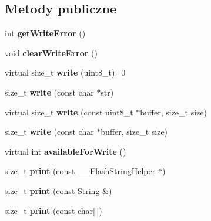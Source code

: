 \subsection*{Metody publiczne}
\begin{DoxyCompactItemize}
\item 
\mbox{\label{class_print_a88a4a829fb5d589efb43955ad0cbddcc}} 
int {\bfseries get\+Write\+Error} ()
\item 
\mbox{\label{class_print_aec9ecf84cc6d9087a650def3cefc459e}} 
void {\bfseries clear\+Write\+Error} ()
\item 
\mbox{\label{class_print_a5be30d49adae2406a270c29ba9a3e0a3}} 
virtual size\+\_\+t {\bfseries write} (uint8\+\_\+t)=0
\item 
\mbox{\label{class_print_a5b40e0e9cab1f2fe5bb0cb22ffe5adda}} 
size\+\_\+t {\bfseries write} (const char $\ast$str)
\item 
\mbox{\label{class_print_ad98d820df11e2697be1e4b1ea30b4a23}} 
virtual size\+\_\+t {\bfseries write} (const uint8\+\_\+t $\ast$buffer, size\+\_\+t size)
\item 
\mbox{\label{class_print_abfdd93a61c4b95a3ba41680188505e73}} 
size\+\_\+t {\bfseries write} (const char $\ast$buffer, size\+\_\+t size)
\item 
\mbox{\label{class_print_ae278602698f895c25820f18da4e765be}} 
virtual int {\bfseries available\+For\+Write} ()
\item 
\mbox{\label{class_print_aa4158dd94bc1741f92d99c427261d7c0}} 
size\+\_\+t {\bfseries print} (const \+\_\+\+\_\+\+Flash\+String\+Helper $\ast$)
\item 
\mbox{\label{class_print_a157007ca7ea8334ba7eb4bc705740216}} 
size\+\_\+t {\bfseries print} (const String \&)
\item 
\mbox{\label{class_print_acfe80773011eb17dfb52c2fba517a093}} 
size\+\_\+t {\bfseries print} (const char\mbox{[}$\,$\mbox{]})
\item 
\mbox{\label{class_print_a1e411d07a8ffec5faf7ce485bac0f029}} 

\end{DoxyCompactItemize}
